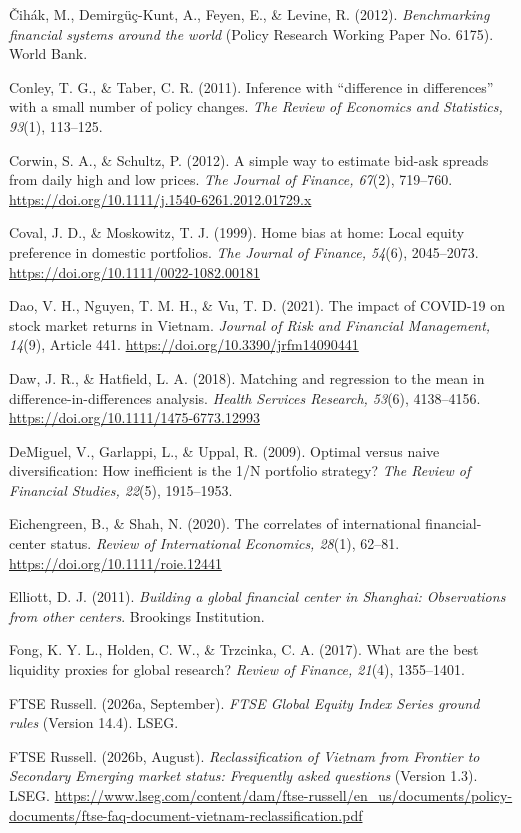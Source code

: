 \begin{list}{}{\setlength{\leftmargin}{1.5em}\setlength{\itemindent}{-1.5em}\setlength{\itemsep}{2pt}\small}
\item Čihák, M., Demirgüç-Kunt, A., Feyen, E., \& Levine, R. (2012). \emph{Benchmarking financial systems around the world} (Policy Research Working Paper No. 6175). World Bank.
\item Conley, T. G., \& Taber, C. R. (2011). Inference with \enquote{difference in differences} with a small number of policy changes. \emph{The Review of Economics and Statistics, 93}(1), 113–125.
\item Corwin, S. A., \& Schultz, P. (2012). A simple way to estimate bid-ask spreads from daily high and low prices. \emph{The Journal of Finance, 67}(2), 719–760. \url{https://doi.org/10.1111/j.1540-6261.2012.01729.x}
\item Coval, J. D., \& Moskowitz, T. J. (1999). Home bias at home: Local equity preference in domestic portfolios. \emph{The Journal of Finance, 54}(6), 2045–2073. \url{https://doi.org/10.1111/0022-1082.00181}
\item Dao, V. H., Nguyen, T. M. H., \& Vu, T. D. (2021). The impact of COVID-19 on stock market returns in Vietnam. \emph{Journal of Risk and Financial Management, 14}(9), Article 441. \url{https://doi.org/10.3390/jrfm14090441}
\item Daw, J. R., \& Hatfield, L. A. (2018). Matching and regression to the mean in difference-in-differences analysis. \emph{Health Services Research, 53}(6), 4138–4156. \url{https://doi.org/10.1111/1475-6773.12993}
\item DeMiguel, V., Garlappi, L., \& Uppal, R. (2009). Optimal versus naive diversification: How inefficient is the 1/N portfolio strategy? \emph{The Review of Financial Studies, 22}(5), 1915–1953.
\item Eichengreen, B., \& Shah, N. (2020). The correlates of international financial-center status. \emph{Review of International Economics, 28}(1), 62–81. \url{https://doi.org/10.1111/roie.12441}
\item Elliott, D. J. (2011). \emph{Building a global financial center in Shanghai: Observations from other centers}. Brookings Institution.
\item Fong, K. Y. L., Holden, C. W., \& Trzcinka, C. A. (2017). What are the best liquidity proxies for global research? \emph{Review of Finance, 21}(4), 1355–1401.
\item FTSE Russell. (2026a, September). \emph{FTSE Global Equity Index Series ground rules} (Version 14.4). LSEG.
\item FTSE Russell. (2026b, August). \emph{Reclassification of Vietnam from Frontier to Secondary Emerging market status: Frequently asked questions} (Version 1.3). LSEG. \url{https://www.lseg.com/content/dam/ftse-russell/en_us/documents/policy-documents/ftse-faq-document-vietnam-reclassification.pdf}

\end{list}
